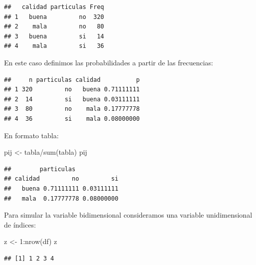 \documentclass[
]{book}
\newenvironment{Shaded}{\begin{snugshade}}{\end{snugshade}}
\newcommand{\DecValTok}[1]{\textcolor[rgb]{0.00,0.00,0.81}{#1}}
\newcommand{\FunctionTok}[1]{\textcolor[rgb]{0.00,0.00,0.00}{#1}}
\newcommand{\NormalTok}[1]{#1}
\newcommand{\OtherTok}[1]{\textcolor[rgb]{0.56,0.35,0.01}{#1}}
\newcommand{\SpecialCharTok}[1]{\textcolor[rgb]{0.00,0.00,0.00}{#1}}
\theoremstyle{break}
\theoremstyle{definition}
\theoremstyle{definition}
\theoremstyle{definition}
\theoremstyle{definition}
\theoremstyle{remark}
\begin{document}
\begin{verbatim}
##   calidad particulas Freq
## 1   buena         no  320
## 2    mala         no   80
## 3   buena         si   14
## 4    mala         si   36
\end{verbatim}

En este caso definimos las probabilidades a partir de las frecuencias:

\begin{Shaded}
\end{Shaded}

\begin{verbatim}
##     n particulas calidad          p
## 1 320         no   buena 0.71111111
## 2  14         si   buena 0.03111111
## 3  80         no    mala 0.17777778
## 4  36         si    mala 0.08000000
\end{verbatim}

En formato tabla:

\begin{Shaded}
\begin{Highlighting}[]
\NormalTok{pij }\OtherTok{\textless{}{-}}\NormalTok{ tabla}\SpecialCharTok{/}\FunctionTok{sum}\NormalTok{(tabla)}
\NormalTok{pij}
\end{Highlighting}
\end{Shaded}

\begin{verbatim}
##        particulas
## calidad         no         si
##   buena 0.71111111 0.03111111
##   mala  0.17777778 0.08000000
\end{verbatim}

Para simular la variable bidimensional consideramos una variable
unidimensional de índices:

\begin{Shaded}
\begin{Highlighting}[]
\NormalTok{z }\OtherTok{\textless{}{-}} \DecValTok{1}\SpecialCharTok{:}\FunctionTok{nrow}\NormalTok{(df)}
\NormalTok{z}
\end{Highlighting}
\end{Shaded}

\begin{verbatim}
## [1] 1 2 3 4
\end{verbatim}
\end{document}

